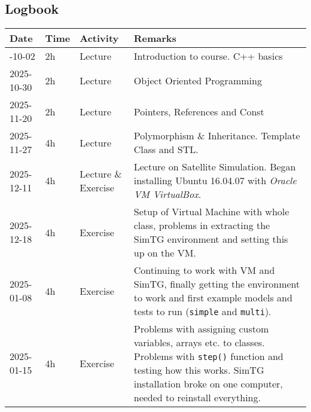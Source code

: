 \begin{appendices}

\section{Logbook}
\label{sec:logbook}

\begin{table}[H]
\centering
    \begin{tabularx}{\textwidth} {
    | >{\hsize=0.45\hsize}X     %
    | >{\hsize=0.2\hsize}X     %
    | >{\hsize=0.4\hsize}X      %
    | >{\hsize=1.95\hsize}X      %
    |}
    \hline
    \textbf{Date} & \textbf{Time} & \textbf{Activity} & \textbf{Remarks} \\ \hline\hline
        2025-10-02 & 2h & Lecture  & Introduction to course. C++ basics \\ \hline
        
        2025-10-30 & 2h & Lecture  &  Object Oriented Programming \\ \hline
        
        2025-11-20 & 2h & Lecture  & Pointers, References and Const \\ \hline
        
        2025-11-27 & 4h & Lecture  & Polymorphism \& Inheritance. Template Class and STL.  \\ \hline
        
        2025-12-11 & 4h & Lecture \& Exercise  & Lecture on Satellite Simulation. Began installing Ubuntu 16.04.07 with \textit{Oracle VM VirtualBox}. \\ \hline
        
        2025-12-18 & 4h & Exercise & Setup of Virtual Machine with whole class, problems in extracting the SimTG environment and setting this up on the VM. \\ \hline
        
        2025-01-08 & 4h & Exercise & Continuing to work with VM and SimTG, finally getting the environment to work and first example models and tests to run (\texttt{simple} and \texttt{multi}).  \\ \hline

        2025-01-15 & 4h & Exercise & Problems with assigning custom variables, arrays etc. to classes. Problems with \texttt{step()} function and testing how this works. SimTG installation broke on one computer, needed to reinstall everything. \\ \hline
        

\end{tabularx}
\end{table}
\end{appendices}
